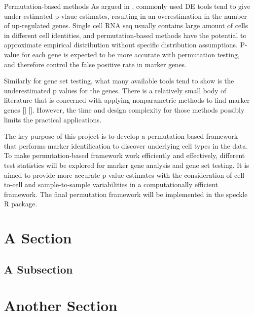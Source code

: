 Permutation-based methods  
As argued in , commonly used DE tools tend to give under-estimated p-vlaue estimates, resulting in an overestimation in the number of up-regulated genes.  
Single cell RNA seq usually contains large amount of cells in different cell identities, and permutation-based methods have the potential to approximate empirical distribution without specific distribution assumptions. P-value for each gene is expected to be more accurate with permutation testing, and therefore control the false positive rate in marker genes. 

Similarly for gene set testing, what many available tools tend to show is the underestimated p values for the genes. 
There is a relatively small body of literature that is concerned with applying nonparametric methods to find marker genes [] []. However, the time and design complexity for those methods possibly limits the practical applications. 

The key purpose of this project is to develop a permutation-based framework that performs marker identification to discover underlying cell types in the data. 
To make permutation-based framework work efficiently and effectively, different test statistics will be explored for marker gene analysis and gene set testing. It is aimed to provide more accurate p-value estimates with the consideration of cell-to-cell and sample-to-sample variabilities in a computationally efficient framework. The final permutation framework will be implemented in the speckle R package. 



\section{A Section}


\subsection{A Subsection}


\section{Another Section}
